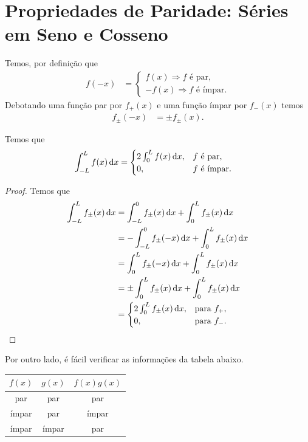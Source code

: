 \section{Propriedades de Paridade: S\'{e}ries em Seno e Cosseno}
Temos, por defini\c{c}\~{a}o que
\begin{align*}
    f(-x) &= \begin{cases}
        f(x) \Rightarrow f \text{ \'{e} par}, \\
        -f(x) \Rightarrow f \text{ \'{e} \'{i}mpar}.
    \end{cases}
\end{align*}
Debotando uma fun\c{c}\~{a}o par por $f_+(x)$ e uma fun\c{c}\~{a}o \'{i}mpar por $f_-(x)$ temos
\begin{align*}
    f_\pm(-x) &= \pm f_\pm(x).
\end{align*}

\begin{prop}
    Temos que
    \begin{align*}
        \int_{-L}^L f(x) \, \mathrm{d}x &= \begin{cases}
            2 \int_0^L f(x) \, \mathrm{d}x, & f \text{ \'{e} par}, \\
            0, & f \text{ \'{e} \'{i}mpar}.
        \end{cases}
    \end{align*}
\end{prop}
\begin{proof}
    Temos que
    \begin{align*}
        \int_{-L}^L f_\pm(x) \, \mathrm{d}x &= \int_{-L}^0 f_\pm(x) \, \mathrm{d}x + \int_0^L f_\pm(x) \, \mathrm{d}x \\
        &= -\int_{-L}^0 f_\pm(-x) \, \mathrm{d}x + \int_0^L f_\pm(x) \, \mathrm{d}x \\
        &= \int_0^L f_\pm(-x) \, \mathrm{d}x + \int_0^L f_\pm(x) \, \mathrm{d}x \\
        &= \pm \int_0^L f_\pm(x) \, \mathrm{d}x + \int_0^L f_\pm(x) \, \mathrm{d}x \\
        &= \begin{cases}
            2 \int_0^L f_\pm(x) \, \mathrm{d}x, & \text{para } f_+, \\
            0, & \text{para } f_-.
        \end{cases}
    \end{align*}
\end{proof}

Por outro lado, \'{e} f\'{a}cil verificar as informa\c{c}\~{o}es da tabela abaixo.
\begin{table}[htb]
    \centering
    \begin{tabular}{|c|c|c|}
        \hline
        $f(x)$ & $g(x)$ & $f(x) g(x)$ \\ \hline
        par & par & par \\ \hline
        \'{i}mpar & par & \'{i}mpar \\ \hline
        \'{i}mpar & \'{i}mpar & par \\ \hline
    \end{tabular}
\end{table}

